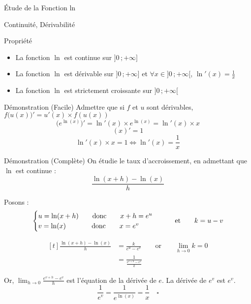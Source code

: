 \documentclass{cours}
\begin{document}
    \begin{Gpartie}{Étude de la Fonction ln}
        \begin{Spartie}{Continuité, Dérivabilité}
            \begin{SSpartie}{Propriété}
                \begin{itemize}
                    \item La fonction $\ln$ est continue sur $\big]0\,;+\infty\big]$
                    \item La fonction $\ln$ est dérivable sur $\big]0\,;+\infty\big]$ et $\forall x\in\big]0\,;+\infty\big[$, $\ln'(x)=\frac{1}{x}$
                    \item La fonction $\ln$ est strictement croissante sur $\big]0\,;+\infty\big[$
                \end{itemize}
                \begin{SSSpartie}{Démonstration (Facile)}
                    Admettre que si $f$ et $u$ sont dérivables, $f\big(u(x)\big)'=u'(x)\times f(u(x))$
                    \[\big(e^{\ln(x)}\big)'=\ln'(x)\times e^{\ln(x)}=\ln'(x)\times x\]
                    \[(x)'=1\]
                    \[\ln'(x)\times x=1\iff\ln'(x)=\frac{1}{x}\]
                    
                \end{SSSpartie}
                \begin{SSSpartie}{Démonstration (Complète)} 
                    On étudie le taux d'accroissement, en admettant que $\ln$ est continue :
                    \[\frac{\ln(x+h)-\ln(x)}{h}\]

                    Posons :
                    \[\begin{cases}
                        u=\ln(x+h)\qquad\text{donc}\qquad x+h=e^u \\ v=\ln(x)\phantom{+h)}\text{\qquad donc\qquad} x=e^v
                    \end{cases}\qquad\text{et}\qquad k=u-v\]

                    \[\begin{aligned}[t]
                        \frac{\ln(x+h)-\ln(x)}{h}&=\frac{k}{e^u-e^v}\qquad\text{or}\qquad\lim_{h\to0}k=0 \\
                        &=\frac{1}{\frac{e^{v+h}-e^v}{k}}
                    \end{aligned}\]

                    Or, $\lim_{h\to0}\frac{e^{v+h}-e^v}{h}$ est l'équation de la dérivée de $e$. La dérivée de $e^v$ est $e^v$.
                    \[\frac{1}{e^v}=\frac{1}{e^{\ln(x)}}=\frac{1}{x}\quad\square\]


\end{SSSpartie}
\end{SSpartie}
\end{Spartie}
\end{Gpartie}
\end{document}
